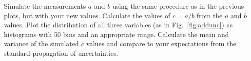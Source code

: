 \begin{plot}
Simulate the measurements $a$ and $b$ using the same procedure as in the previous plots, but with your new values.  Calculate the values of $c = a/b $ from
the $a$ and $b$ values.  Plot the distribution of all three variables (as in
Fig.~\ref{fig:addunc}) as histograms with 50 bins and an appropriate
range.  Calculate the mean and variance of the simulated $c$ values
and compare to your expectations from the standard propagation of
uncertainties.
\end{plot}
























